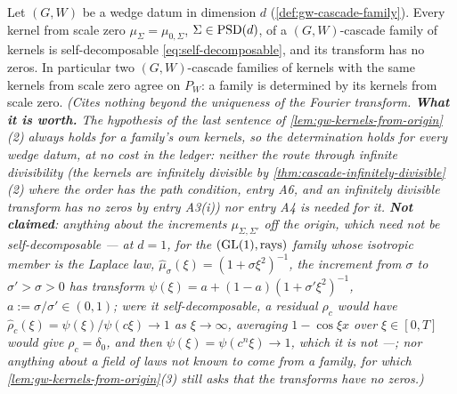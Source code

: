 \begin{lemma}
\label{lem:gw-kernels-self-decomposable}
\leanok
Let $(G, W)$ be a wedge datum in dimension $d$ (\ref{def:gw-cascade-family}). Every kernel from scale zero $\mu_\Sigma = \mu_{0,\Sigma}$, $\Sigma \in \mathrm{PSD}(d)$, of a $(G, W)$-cascade family of kernels is
self-decomposable \ref{eq:self-decomposable}, and its transform has no zeros. In particular two
$(G, W)$-cascade families of kernels with the same kernels from scale zero agree on $P_W$: a family is
determined by its kernels from scale zero.
\statusT\quad\emph{(Cites nothing beyond the uniqueness of the Fourier transform. \textbf{What it is
worth.} The hypothesis of the last sentence of \ref{lem:gw-kernels-from-origin}(2) always holds for a
family's own kernels, so the determination holds for every wedge datum, at no cost in the ledger: neither the route through infinite divisibility (the kernels
are infinitely divisible by \ref{thm:cascade-infinitely-divisible}(2) where the order has the path
condition, entry A6, and an infinitely divisible transform has no zeros by entry A3(i)) nor entry A4 is
needed for it. \textbf{Not claimed}: anything about the increments $\mu_{\Sigma,\Sigma'}$ off the origin,
which need not be self-decomposable --- at $d = 1$, for the $(\mathrm{GL}(1), \text{rays})$ family whose
isotropic member is the Laplace law, $\widehat\mu_\sigma(\xi) = (1 + \sigma\xi^2)^{-1}$, the increment from
$\sigma$ to $\sigma' > \sigma > 0$ has transform $\psi(\xi) = a + (1 - a)(1 + \sigma'\xi^2)^{-1}$,
$a := \sigma/\sigma' \in (0,1)$; were it self-decomposable, a residual $\rho_c$ would have
$\widehat\rho_c(\xi) = \psi(\xi)/\psi(c\xi) \to 1$ as $\xi \to \infty$, averaging $1 - \cos\xi x$ over
$\xi \in [0,T]$ would give $\rho_c = \delta_0$, and then $\psi(\xi) = \psi(c^n\xi) \to 1$, which it is not
---; nor anything about a field of laws not known to come from a family, for which
\ref{lem:gw-kernels-from-origin}(3) still asks that the transforms have no zeros.)}
\end{lemma}

